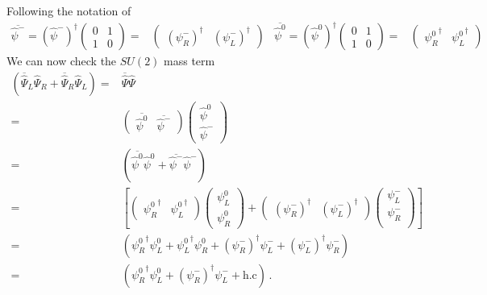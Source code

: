Following the notation of \cite{Martin:2012us}
\begin{align*}
  \overline{\widehat{\psi}^-}=\left( {\widehat{\psi}^-} \right)^{\dagger}
  \begin{pmatrix}
    0 & 1\\
   1 & 0
  \end{pmatrix}=&
    \begin{pmatrix}
      \left( \psi_{R}^- \right)^{\dagger} & \left( \psi_{L}^- \right)^{\dagger}
    \end{pmatrix}&
  \overline{\widehat{\psi}^0}=\left( \widehat{\psi}^0 \right)^{\dagger}  \begin{pmatrix}
    0 & 1\\
   1 & 0
  \end{pmatrix}=&\begin{pmatrix}
{\psi_{R}^0 }^{\dagger} & {\psi_{L}^0 }^{\dagger} 
\end{pmatrix}
\end{align*}
We can now check the $SU(2)$ mass term
\begin{align}
\label{eq:mdpsipsi}
  \left( \overline{\widehat{\Psi}}_{L}\widehat{\Psi}_{R}+\overline{\widehat{\Psi}}_{R}\widehat{\Psi}_{L} \right)=&  \overline{\widehat{\Psi}}\widehat{\Psi} \nonumber\\
=&   \begin{pmatrix}
    \overline{\widehat{\psi}^0} &  \overline{\widehat{\psi}^-} 
  \end{pmatrix}
  \begin{pmatrix}
    \widehat{\psi}^0 \\
    \widehat{\psi}^-
  \end{pmatrix}\nonumber\\
= & \left(     \overline{\widehat{\psi}^0}\widehat{\psi}^0 +
    \overline{\widehat{\psi}^-} \widehat{\psi}^-
 \right) \nonumber\\
= & \left[
\begin{pmatrix}
{\psi_{R}^0 }^{\dagger} & {\psi_{L}^0 }^{\dagger} 
\end{pmatrix} \begin{pmatrix}
    \psi_{L}^0\\
    \psi_{R}^0
  \end{pmatrix}
+\begin{pmatrix}
      \left(\psi_{R}^{-}\right)^\dagger & \left(\psi_{L}^{-}\right)^\dagger
    \end{pmatrix} \begin{pmatrix}
   \psi_{L}^{-}\\
   \psi_{R}^{-}\\
  \end{pmatrix}
 \right] \nonumber\\
= & \left(
    {\psi_{R}^0 }^{\dagger}\psi_{L}^0+
   {\psi_{L}^0 }^{\dagger} \psi_{R}^0+
   \left(\psi_{R}^{-}\right)^\dagger\psi_{L}^{-}+
   \left(\psi_{L}^{-}\right)^\dagger\psi_{R}^{-}
 \right) \nonumber\\
= & \left(
    {\psi_{R}^0 }^{\dagger}\psi_{L}^0+
    \left(\psi_{R}^{-}\right)^\dagger\psi_{L}^{-}+
 \text{h.c}
 \right)\,.
\end{align}



